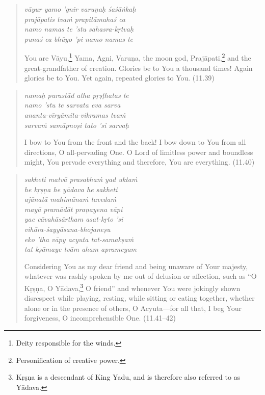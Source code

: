 \documentclass[12pt, twoside, openright]{memoir}
\begin{document}
\par
\begin{verse}
\textit{vāyur yamo ’gnir varuṇaḥ śaśāṅkaḥ} \\
\textit{prajāpatis tvaṁ prapitāmahaś ca} \\
\textit{namo namas te ’stu sahasra-kṛtvaḥ} \\
\textit{punaś ca bhūyo ’pi namo namas te}

\noindent You are Vāyu,\footnote{Deity responsible for the winds.} Yama, Agni, Varuṇa, the moon god, Prajāpati,\footnote{Personification of creative power.} and the great-grandfather of creation. Glories be to You a thousand times! Again glories be to You. Yet again, repeated glories to You. (11.39)
\end{verse}
\par



\par
\begin{verse}
\textit{namaḥ purastād atha pṛṣṭhatas te} \\
\textit{namo ’stu te sarvata eva sarva} \\
\textit{ananta-vīryāmita-vikramas tvaṁ} \\
\textit{sarvaṁ samāpnoṣi tato ’si sarvaḥ}

\noindent I bow to You from the front and the back! I bow down to You from all directions, O all-pervading One. O Lord of limitless power and boundless might, You pervade everything and therefore, You are everything. (11.40)
\end{verse}
\par



\par
\begin{verse}
\textit{sakheti matvā prasabhaṁ yad uktaṁ} \\
\textit{he kṛṣṇa he yādava he sakheti} \\
\textit{ajānatā mahimānaṁ tavedaṁ} \\
\textit{mayā pramādāt praṇayena vāpi} \\
\textit{yac cāvahāsārtham asat-kṛto ’si} \\
\textit{vihāra-śayyāsana-bhojaneṣu} \\
\textit{eko ’tha vāpy acyuta tat-samakṣaṁ} \\
\textit{tat kṣāmaye tvām aham aprameyam}

\noindent Considering You as my dear friend and being unaware of Your majesty, whatever was rashly spoken by me out of delusion or affection, such as \enquote{O Kṛṣṇa, O Yādava,\footnote{Kṛṣṇa is a descendant of King Yadu, and is therefore also referred to as Yādava.} O friend} and whenever You were jokingly shown disrespect while playing, resting, while sitting or eating together, whether alone or in the presence of others, O Acyuta---for all that, I beg Your forgiveness, O incomprehensible One. (11.41–42)
\end{verse}
\par
\end{document}
